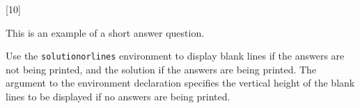 [10]

This is an example of a short answer question.

\begin{solutionorlines}[1in]

  Use the \texttt{solutionorlines} environment to display blank lines if the
  answers are not being printed, and the solution if the answers are being
  printed. The argument to the environment declaration specifies the vertical
  height of the blank lines to be displayed if no answers are being printed.

\end{solutionorlines}
